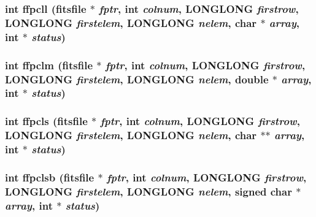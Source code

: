 \subsubsection{\setlength{\rightskip}{0pt plus 5cm}int ffpcll (\bf{fitsfile} $\ast$ {\em fptr}, int {\em colnum}, \bf{LONGLONG} {\em firstrow}, \bf{LONGLONG} {\em firstelem}, \bf{LONGLONG} {\em nelem}, char $\ast$ {\em array}, int $\ast$ {\em status})}\label{test_2shm__client_2fitsio_8h_353d8ec816b71620a84af201290d5932}


\subsubsection{\setlength{\rightskip}{0pt plus 5cm}int ffpclm (\bf{fitsfile} $\ast$ {\em fptr}, int {\em colnum}, \bf{LONGLONG} {\em firstrow}, \bf{LONGLONG} {\em firstelem}, \bf{LONGLONG} {\em nelem}, double $\ast$ {\em array}, int $\ast$ {\em status})}\label{test_2shm__client_2fitsio_8h_af1f2dc6beaea63dbf91a8be037be940}


\subsubsection{\setlength{\rightskip}{0pt plus 5cm}int ffpcls (\bf{fitsfile} $\ast$ {\em fptr}, int {\em colnum}, \bf{LONGLONG} {\em firstrow}, \bf{LONGLONG} {\em firstelem}, \bf{LONGLONG} {\em nelem}, char $\ast$$\ast$ {\em array}, int $\ast$ {\em status})}\label{test_2shm__client_2fitsio_8h_d58114695cd1281daa17eff622c1e38a}


\subsubsection{\setlength{\rightskip}{0pt plus 5cm}int ffpclsb (\bf{fitsfile} $\ast$ {\em fptr}, int {\em colnum}, \bf{LONGLONG} {\em firstrow}, \bf{LONGLONG} {\em firstelem}, \bf{LONGLONG} {\em nelem}, signed char $\ast$ {\em array}, int $\ast$ {\em status})}\label{test_2shm__client_2fitsio_8h_3c19da60283d0f6c16d2c4508ee2b551}


